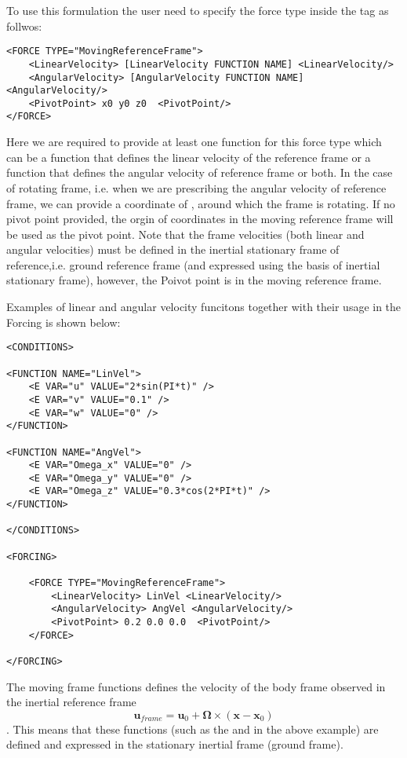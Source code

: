 To use this formulation the user need to specify the force type inside the  tag as follwos:

\begin{lstlisting}[style=XMLStyle]
<FORCE TYPE="MovingReferenceFrame">
    <LinearVelocity> [LinearVelocity FUNCTION NAME] <LinearVelocity/>
    <AngularVelocity> [AngularVelocity FUNCTION NAME] <AngularVelocity/>
    <PivotPoint> x0 y0 z0  <PivotPoint/>
</FORCE>
\end{lstlisting}

Here we are required to provide at least one function for this force type which can be a function that defines the linear velocity of the reference frame or a function that defines the angular velocity of reference frame or both. In the case of rotating frame, i.e. when we are prescribing the angular velocity of reference frame, we can provide a coordinate of , around which the frame is rotating. If no pivot point provided, the orgin of coordinates in the moving reference frame will be used as the pivot point. 
Note that the frame velocities (both linear and angular velocities) must be defined in the inertial stationary frame of reference,i.e. ground reference frame (and expressed using the basis of inertial stationary frame), however, the Poivot point is in the moving reference frame.

Examples of linear and angular velocity funcitons together with their usage in the Forcing is shown below:

\begin{lstlisting}[style=XMLStyle]
<CONDITIONS>

<FUNCTION NAME="LinVel">
    <E VAR="u" VALUE="2*sin(PI*t)" />
    <E VAR="v" VALUE="0.1" />
    <E VAR="w" VALUE="0" />
</FUNCTION>

<FUNCTION NAME="AngVel">
    <E VAR="Omega_x" VALUE="0" />
    <E VAR="Omega_y" VALUE="0" />
    <E VAR="Omega_z" VALUE="0.3*cos(2*PI*t)" />
</FUNCTION>

</CONDITIONS>

<FORCING>

    <FORCE TYPE="MovingReferenceFrame">
        <LinearVelocity> LinVel <LinearVelocity/>
        <AngularVelocity> AngVel <AngularVelocity/>
        <PivotPoint> 0.2 0.0 0.0  <PivotPoint/>
    </FORCE>

</FORCING>
\end{lstlisting}


The moving frame functions defines the velocity of the body frame observed in the inertial reference frame $$\mathbf{u}_{frame} = \mathbf{u}_0 + \mathbf{\Omega}\times (\mathbf{x}-\mathbf{x}_0)$$. This means that these functions (such as the  and  in the above example) are defined and expressed in the stationary inertial frame (ground frame).

